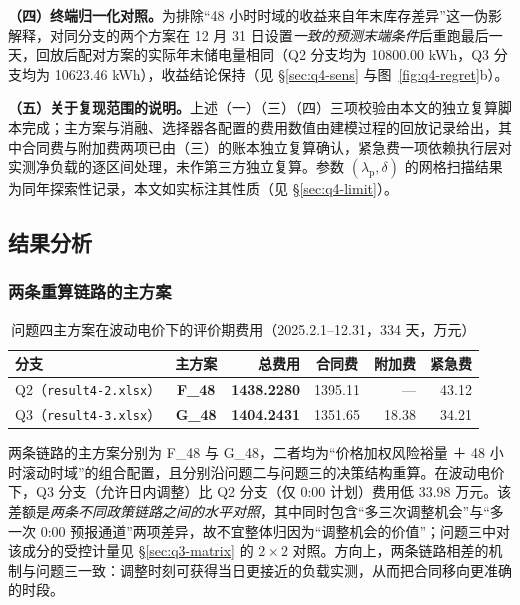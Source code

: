 \textbf{（四）终端归一化对照。}为排除``48 小时时域的收益来自年末库存差异''这一伪影解释，对同分支的两个方案在 12 月 31 日设置\emph{一致的预测末端条件}后重跑最后一天，回放后配对方案的实际年末储电量相同（Q2 分支均为 10800.00 kWh，Q3 分支均为 10623.46 kWh），收益结论保持（见 \S\ref{sec:q4-sens} 与图~\ref{fig:q4-regret}b）。

\textbf{（五）关于复现范围的说明。}上述（一）（三）（四）三项校验由本文的独立复算脚本完成；主方案与消融、选择器各配置的费用数值由建模过程的回放记录给出，其中合同费与附加费两项已由（三）的账本独立复算确认，紧急费一项依赖执行层对实测净负载的逐区间处理，未作第三方独立复算。参数 $(\lambda_{\mathrm{p}},\delta)$ 的网格扫描结果为同年探索性记录，本文如实标注其性质（见 \S\ref{sec:q4-limit}）。

\subsection{结果分析}
\label{sec:q4-results}

\subsubsection{两条重算链路的主方案}

\begin{table}[H]
  \centering
  \caption{问题四主方案在波动电价下的评价期费用（2025.2.1--12.31，334 天，万元）}
  \label{tab:q4-main}
  \begin{tabular}{lcrcrr}
    \toprule
    分支 & 主方案 & 总费用 & 合同费 & 附加费 & 紧急费 \\
    \midrule
    Q2（\texttt{result4-2.xlsx}） & \textbf{F\_48} & \textbf{1438.2280} & 1395.11 & — & 43.12 \\
    Q3（\texttt{result4-3.xlsx}） & \textbf{G\_48} & \textbf{1404.2431} & 1351.65 & 18.38 & 34.21 \\
    \bottomrule
  \end{tabular}
\end{table}

两条链路的主方案分别为 F\_48 与 G\_48，二者均为``价格加权风险裕量 ＋ 48 小时滚动时域''的组合配置，且分别沿问题二与问题三的决策结构重算。在波动电价下，Q3 分支（允许日内调整）比 Q2 分支（仅 0:00 计划）费用低 33.98 万元。该差额是\emph{两条不同政策链路之间的水平对照}，其中同时包含``多三次调整机会''与``多一次 0:00 预报通道''两项差异，故不宜整体归因为``调整机会的价值''；问题三中对该成分的受控计量见 \S\ref{sec:q3-matrix} 的 $2\times2$ 对照。方向上，两条链路相差的机制与问题三一致：调整时刻可获得当日更接近的负载实测，从而把合同移向更准确的时段。


